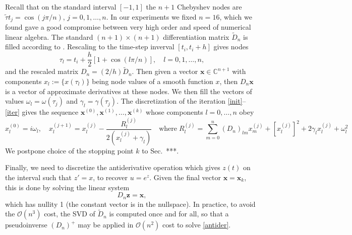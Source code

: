\documentclass[10pt]{article}
\newcommand{\be}{\begin{equation}}
\newcommand{\ee}{\end{equation}}
\newcommand{\mbf}[1]{{\mathbf #1}}
\newcommand{\C}{\mathbb{C}}
\newcommand{\bigO}{{\mathcal O}}
\newcommand{\om}{\omega}
\newcommand{\g}{\gamma}
\begin{document}
Recall that on the standard interval $[-1, 1]$ the $n+1$ Chebyshev nodes are
$\tilde\tau{t}_j = \cos\left( j\pi/n\right)$, $j = 0, 1, \dots, n$.
In our experiments we fixed $n=16$, which we found gave a good compromise
between very high order and speed of numerical linear algebra.
The standard $(n+1) \times (n+1)$ differentiation matrix $\tilde{D}_n$
is filled according to \cite[Ch.~6]{tref}.
Rescaling to the time-step inverval $[t_i, t_i+h]$
gives nodes
\be\label{scaledt}
\tau_l = t_i + \frac{h}{2}[1+\cos (l\pi/n)], \quad l = 0, 1, \ldots, n,
\ee
and the rescaled matrix $D_n = (2/h) \tilde D_n$.
Then given a vector $\mbf{x}\in\C^{n+1}$ with components
$x_l := \{x(\tau_l)\}$ being node values of a smooth function $x$,
then $D_n\mbf{x}$ is a vector of approximate derivatives at these nodes.
We then fill the vectors of values $\om_l=\om(\tau_j)$
and $\g_l=\gamma(\tau_j)$.
The discretization of the iteration \eqref{init}--\eqref{iter}
gives the sequence $\mbf{x}^{(0)}, \mbf{x}^{(1)},\dots,\mbf{x}^{(k)}$ whose
components $l=0,\dots, n$ obey
$$
x^{(0)}_l = i\om_l,
\quad
x^{(j+1)}_l = x^{(j)}_l - \frac{R^{(j)}_l}{2(x^{(j)}_l + \g_l)}
\quad \mbox{where}\;
R^{(j)}_l = \sum_{m=0}^n (D_n)_{lm}x^{(j)}_m  + [x^{(j)}_l]^2 + 2\g_lx^{(j)}_l + \om_l^2
$$
We postpone choice of the stopping point $k$ to Sec.~***.


Finally, we need to discretize the antiderivative operation which gives
$z(t)$ on the interval such that $z' = x$, to recover $u = e^z$.
Given the final vector $\mbf{x}=\mbf{x}_k$, this is done by solving
the linear system
\be
D_n \mbf{z} = \mbf{x},
\label{antider}
\ee
which has nullity 1 (the constant vector is in the nullspace).
In practice, to avoid the $\bigO(n^3)$ cost,
the SVD of $\tilde D_n$ is computed once and for all,
so that a pseudoinverse $(D_n)^+$ may be applied in $\bigO(n^2)$ cost
to solve \eqref{antider}.
\end{document}
